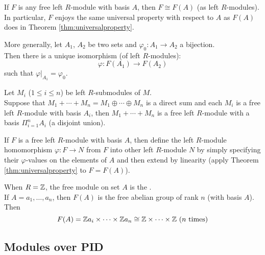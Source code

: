 \begin{corollary}
If $F$ is any free left $R$-module with basis $A$, then $F \cong F(A)$ (as left $R$-modules).\\
In particular, $F$ enjoys the same universal property with respect to $A$ as $F(A)$ does in Theorem \ref{thm:universalproperty}.
\end{corollary}

\begin{remark}
More generally, let $A_1$, $A_2$ be two sets and $\varphi_0 : A_1 \rightarrow A_2$ a bijection.\\
Then there is a unique isomorphism (of left $R$-modules):
\begin{equation}
\varphi: F(A_1) \rightarrow F(A_2) \nonumber
\end{equation}
such that $\varphi|_{A_1} = \varphi_0$.
\end{remark}

\begin{remark}
Let $M_i$ ($1 \leq i \leq n$) be left $R$-submodules of $M$.\\
Suppose that $M_1 + \cdots + M_n = M_1 \oplus \cdots \oplus M_n$ is a direct sum and each $M_i$ is a free left $R$-module with basis $A_i$, then $M_1 + \cdots + M_n$ is a free left $R$-module with a basis $\Pi_{i=1}^n A_i$ (a disjoint union).
\end{remark}

\begin{remark}
If $F$ is a free left $R$-module with basis $A$, then define the left $R$-module homomorphism $\varphi: F \rightarrow N$ from $F$ into other left $R$-module $N$ by simply specifying their $\varphi$-values on the elements of $A$ and then extend by linearity (apply Theorem \ref{thm:universalproperty} to $F = F(A)$).
\end{remark}

\begin{remark}
When $R = \mathbb{Z}$, the free module on set $A$ is the .\\
If $A={a_1, \ldots, a_n}$, then $F(A)$ is the free abelian group of rank $n$ (with basis $A$). Then
\begin{equation}
F(A) = \mathbb{Z} a_i \times \cdots \times \mathbb{Z} a_n \cong \mathbb{Z} \times \cdots \times \mathbb{Z} \ (n \textnormal{ times}) \nonumber
\end{equation}
\end{remark}

\subsection{Modules over PID}

